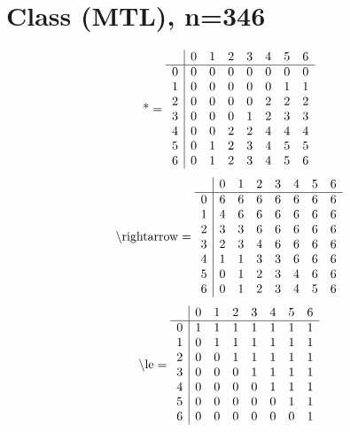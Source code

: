 \documentclass[11pt]{article}
\begin{document}
\section{Class (MTL), n=346}
\[\text{*} = 
\begin{array}{r | r r r r r r r}
 & 0 & 1 & 2 & 3 & 4 & 5 & 6 \\ \hline
0 & 0 & 0 & 0 & 0 & 0 & 0 & 0 \\
1 & 0 & 0 & 0 & 0 & 0 & 1 & 1 \\
2 & 0 & 0 & 0 & 0 & 2 & 2 & 2 \\
3 & 0 & 0 & 0 & 1 & 2 & 3 & 3 \\
4 & 0 & 0 & 2 & 2 & 4 & 4 & 4 \\
5 & 0 & 1 & 2 & 3 & 4 & 5 & 5 \\
6 & 0 & 1 & 2 & 3 & 4 & 5 & 6 \\
\end{array}
\]
\[\text{\textbackslash rightarrow} = 
\begin{array}{r | r r r r r r r}
 & 0 & 1 & 2 & 3 & 4 & 5 & 6 \\ \hline
0 & 6 & 6 & 6 & 6 & 6 & 6 & 6 \\
1 & 4 & 6 & 6 & 6 & 6 & 6 & 6 \\
2 & 3 & 3 & 6 & 6 & 6 & 6 & 6 \\
3 & 2 & 3 & 4 & 6 & 6 & 6 & 6 \\
4 & 1 & 1 & 3 & 3 & 6 & 6 & 6 \\
5 & 0 & 1 & 2 & 3 & 4 & 6 & 6 \\
6 & 0 & 1 & 2 & 3 & 4 & 5 & 6 \\
\end{array}
\]
\[\text{\textbackslash le} = 
\begin{array}{r | r r r r r r r}
 & 0 & 1 & 2 & 3 & 4 & 5 & 6 \\ \hline
0 & 1 & 1 & 1 & 1 & 1 & 1 & 1 \\
1 & 0 & 1 & 1 & 1 & 1 & 1 & 1 \\
2 & 0 & 0 & 1 & 1 & 1 & 1 & 1 \\
3 & 0 & 0 & 0 & 1 & 1 & 1 & 1 \\
4 & 0 & 0 & 0 & 0 & 1 & 1 & 1 \\
5 & 0 & 0 & 0 & 0 & 0 & 1 & 1 \\
6 & 0 & 0 & 0 & 0 & 0 & 0 & 1 \\
\end{array}
\]
\end{document}

